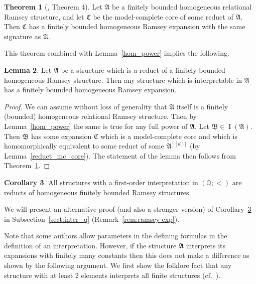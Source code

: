 \documentclass{amsart}
\theoremstyle{definition}
\newtheorem{theorem}{Theorem}[section]
\newtheorem{lemma}[theorem]{Lemma}
\newtheorem{corollary}[theorem]{Corollary}
\theoremstyle{remark}
\numberwithin{equation}{section}
\DeclareMathOperator{\I}{\operatorname{I}}
\newcommand{\fa}{\mathfrak{A}}
\newcommand{\fb}{\mathfrak{B}}
\newcommand{\fc}{\mathfrak{C}}
\begin{document}
\begin{theorem}[\cite{MottetPinskerCores}, Theorem 4]\label{mc_transfer}
	Let $\fa$ be a finitely bounded homogeneous relational Ramsey structure, and let $\fc$ be the model-complete core of some reduct of $\fa$. Then {$\fc$} has a finitely bounded homogeneous Ramsey expansion {with the same signature as $\fa$}.
\end{theorem}

	This theorem combined with Lemma~\ref{hom_power} implies the following.

\begin{lemma}
	Let $\fa$ be a structure which is a reduct of a finitely bounded homogeneous Ramsey structure. Then any structure which is interpretable in $\fa$ has a finitely bounded homogeneous Ramsey expansion. 
\end{lemma}

\begin{proof}
	We can assume without loss of generality that $\fa$ itself is a finitely (bounded) homogeneous relational Ramsey structure. Then by Lemma~\ref{hom_power} the same is true for any full power of $\fa$. Let $\fb\in \I(\fa)$. Then $\fb$ has some expansion $\fc$ which is a model-complete core and which is homomorphically equivalent to some reduct of some $\fa^{[[d]]}$ (by Lemma~\ref{reduct_mc_core}). {The statement of the lemma then follows from Theorem~\ref{mc_transfer}.}
\end{proof}

\begin{corollary}\label{reduct_hom}
	All structures with a first-order interpretation in $({\mathbb Q};<)$ 
    are reducts of homogeneous finitely bounded Ramsey structures.
\end{corollary}

	We will present an alternative proof (and also a stronger version) of Corollary~\ref{reduct_hom} in Subsection~\ref{sect:inter_q} (Remark~\ref{rem:ramsey-exp}).



	Note that some authors
    allow parameters in the defining formulas in the definition of an interpretation.     
    However, if the structure $\fa$ interprets its expansions with finitely many constants then this does not make a difference as shown by the following argument.
	We first show the folklore fact that any structure with at least 2 elements interprets all finite structures (cf.~\cite[Lemma 2.4.4]{bodirsky2021complexity}).
	
\end{document}
